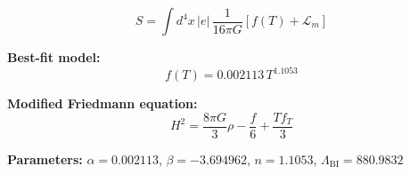 
\begin{equation}
  S = \int d^4x \, |e| \, \frac{1}{16\pi G} \left[ f(T) + \mathcal{L}_m \right]
\end{equation}

\textbf{Best-fit model:}
\begin{equation}
  f(T) = 0.002113 \, T^{1.1053}
\end{equation}

\textbf{Modified Friedmann equation:}
\begin{equation}
  H^2 = \frac{8\pi G}{3} \rho - \frac{f}{6} + \frac{T f_T}{3}
\end{equation}

\textbf{Parameters:}
$\alpha = 0.002113$, \quad
$\beta = -3.694962$, \quad
$n = 1.1053$, \quad
$\Lambda_{\text{BI}} = 880.9832$